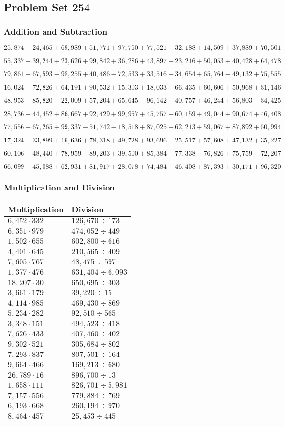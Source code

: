 \hypertarget{problem-set-254}{%
\subsection{Problem Set 254}\label{problem-set-254}}

\hypertarget{addition-and-subtraction}{%
\subsubsection{Addition and
Subtraction}\label{addition-and-subtraction}}

\(25,874+24,465+69,989+51,771+97,760+77,521+32,188+14,509+37,889+70,501\)

\(55,337+39,244+23,626+99,842+36,286+43,897+23,216+50,053+40,428+64,478\)

\(79,861+67,593-98,255+40,486-72,533+33,516-34,654+65,764-49,132+75,555\)

\(16,024+72,826+64,191+90,532+15,303+18,033+66,435+60,606+50,968+81,146\)

\(48,953+85,820-22,009+57,204+65,645-96,142-40,757+46,244+56,803-84,425\)

\(28,736+44,452+86,667+92,429+99,957+45,757+60,159+49,044+90,674+46,408\)

\(77,556-67,265+99,337-51,742-18,518+87,025-62,213+59,067+87,892+50,994\)

\(17,324+33,899+16,636+78,318+49,728+93,696+25,517+57,608+47,132+35,227\)

\(60,106-48,440+78,959-89,203+39,500+85,384+77,338-76,826+75,759-72,207\)

\(66,099+45,088+62,931+81,917+28,078+74,484+46,408+87,393+30,171+96,320\)

\hypertarget{multiplication-and-division}{%
\subsubsection{Multiplication and
Division}\label{multiplication-and-division}}

\begin{longtable}[]{@{}ll@{}}
\toprule
Multiplication & Division\tabularnewline
\midrule
\endhead
\(6,452\cdot332\) & \(126,670÷173\)\tabularnewline
\(6,351\cdot979\) & \(474,052÷449\)\tabularnewline
\(1,502\cdot655\) & \(602,800÷616\)\tabularnewline
\(4,401\cdot645\) & \(210,565÷409\)\tabularnewline
\(7,605\cdot767\) & \(48,475÷597\)\tabularnewline
\(1,377\cdot476\) & \(631,404÷6,093\)\tabularnewline
\(18,207\cdot30\) & \(650,695÷303\)\tabularnewline
\(3,661\cdot179\) & \(39,220÷15\)\tabularnewline
\(4,114\cdot985\) & \(469,430÷869\)\tabularnewline
\(5,234\cdot282\) & \(92,510÷565\)\tabularnewline
\(3,348\cdot151\) & \(494,523÷418\)\tabularnewline
\(7,626\cdot433\) & \(407,460÷402\)\tabularnewline
\(9,302\cdot521\) & \(305,684÷802\)\tabularnewline
\(7,293\cdot837\) & \(807,501÷164\)\tabularnewline
\(9,664\cdot466\) & \(169,213÷680\)\tabularnewline
\(26,789\cdot16\) & \(896,700÷13\)\tabularnewline
\(1,658\cdot111\) & \(826,701÷5,981\)\tabularnewline
\(7,157\cdot556\) & \(779,884÷769\)\tabularnewline
\(6,193\cdot668\) & \(260,194÷970\)\tabularnewline
\(8,464\cdot457\) & \(25,453÷445\)\tabularnewline
\bottomrule
\end{longtable}
